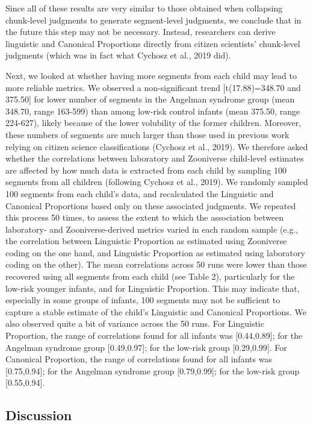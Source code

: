 \documentclass[english,,man]{apa6}
\begin{document}
Since all of these results are very similar to those obtained when collapsing chunk-level judgments to generate segment-level judgments, we conclude that in the future this step may not be necessary. Instead, researchers can derive linguistic and Canonical Proportions directly from citizen scientists' chunk-level judgments (which was in fact what Cychosz et al., 2019 did).

Next, we looked at whether having more segments from each child may lead to more reliable metrics. We observed a non-significant trend {[}t(17.88)=348.70 and 375.50{]} for lower number of segments in the Angelman syndrome group (mean 348.70, range 163-599) than among low-risk control infants (mean 375.50, range 224-627), likely because of the lower volubility of the former children. Moreover, these numbers of segments are much larger than those used in previous work relying on citizen science classifications (Cychosz et al., 2019). We therefore asked whether the correlations between laboratory and Zooniverse child-level estimates are affected by how much data is extracted from each child by sampling 100 segments from all children (following Cychosz et al., 2019). We randomly sampled 100 segments from each child's data, and recalculated the Linguistic and Canonical Proportions based only on these associated judgments. We repeated this process 50 times, to assess the extent to which the association between laboratory- and Zooniverse-derived metrics varied in each random sample (e.g., the correlation between Linguistic Proportion as estimated using Zooniverse coding on the one hand, and Linguistic Proportion as estimated using laboratory coding on the other). The mean correlations across 50 runs were lower than those recovered using all segments from each child (see Table 2), particularly for the low-risk younger infants, and for Linguistic Proportion. This may indicate that, especially in some groups of infants, 100 segments may not be sufficient to capture a stable estimate of the child's Linguistic and Canonical Proportions. We also observed quite a bit of variance across the 50 runs. For Linguistic Proportion, the range of correlations found for all infants was {[}0.44,0.89{]}; for the Angelman syndrome group {[}0.49,0.97{]}; for the low-risk group {[}0.29,0.99{]}. For Canonical Proportion, the range of correlations found for all infants was {[}0.75,0.94{]}; for the Angelman syndrome group {[}0.79,0.99{]}; for the low-risk group {[}0.55,0.94{]}.

\hypertarget{discussion}{%
\subsection{Discussion}\label{discussion}}
\end{document}
